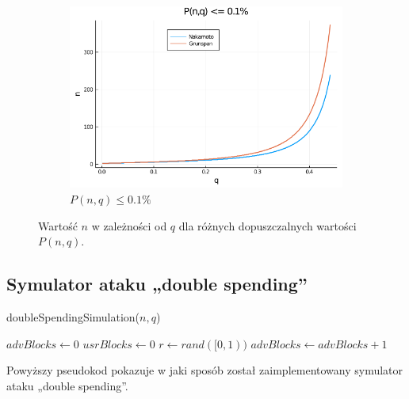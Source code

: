 \documentclass{article}
\newenvironment{pseudokod}[1][htb]{
	\renewcommand{\algorithmcfname}{}
	\begin{algorithm}[#1]%
	}{
\end{algorithm}
}
\begin{document}
\begin{figure}[H]
            \begin{subfigure}{0.65\textwidth}
                \includegraphics[width=\linewidth]{img/limit=0.001.png}
                \caption{$P(n,q) \leq 0.1\%$}
            \end{subfigure}

            \caption{Wartość $n$ w zależności od $q$ dla różnych dopuszczalnych wartości $P(n,q)$.}
        \end{figure}
 
    
    \subsection{Symulator ataku „double spending”}


    \begin{pseudokod}[H]
        \caption{doubleSpendingSimulation($n, q$)}
        \BlankLine
        $advBlocks \gets 0$\;
        $usrBlocks \gets 0$\;
         {
            $r \gets rand( [0,1) )$\;
             {
                $advBlocks \gets advBlocks + 1$\;
            }
        }
        \BlankLine
         {
        }
    \end{pseudokod}

    Powyższy pseudokod pokazuje w jaki sposób został zaimplementowany symulator ataku „double spending”. 
    
\end{document}
